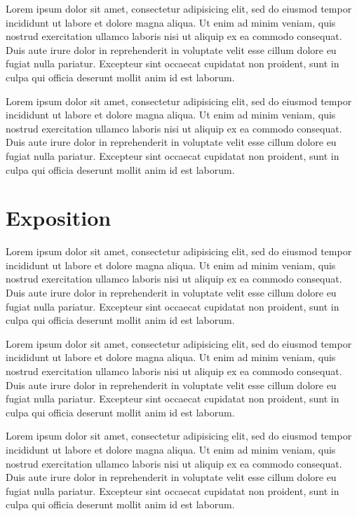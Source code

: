 \documentclass[conference]{acmsiggraph}
\begin{document}
Lorem ipsum dolor sit amet, consectetur adipisicing elit, sed do
eiusmod tempor incididunt ut labore et dolore magna aliqua. Ut enim ad
minim veniam, quis nostrud exercitation ullamco laboris nisi ut
aliquip ex ea commodo consequat. Duis aute irure dolor in
reprehenderit in voluptate velit esse cillum dolore eu fugiat nulla
pariatur. Excepteur sint occaecat cupidatat non proident, sunt in
culpa qui officia deserunt mollit anim id est laborum.

Lorem ipsum dolor sit amet, consectetur adipisicing elit, sed do
eiusmod tempor incididunt ut labore et dolore magna aliqua. Ut enim ad
minim veniam, quis nostrud exercitation ullamco laboris nisi ut
aliquip ex ea commodo consequat. Duis aute irure dolor in
reprehenderit in voluptate velit esse cillum dolore eu fugiat nulla
pariatur. Excepteur sint occaecat cupidatat non proident, sunt in
culpa qui officia deserunt mollit anim id est laborum.

\section{Exposition}

Lorem ipsum dolor sit amet, consectetur adipisicing elit, sed do
eiusmod tempor incididunt ut labore et dolore magna aliqua. Ut enim ad
minim veniam, quis nostrud exercitation ullamco laboris nisi ut
aliquip ex ea commodo consequat. Duis aute irure dolor in
reprehenderit in voluptate velit esse cillum dolore eu fugiat nulla
pariatur. Excepteur sint occaecat cupidatat non proident, sunt in
culpa qui officia deserunt mollit anim id est laborum.

Lorem ipsum dolor sit amet, consectetur adipisicing elit, sed do
eiusmod tempor incididunt ut labore et dolore magna aliqua. Ut enim ad
minim veniam, quis nostrud exercitation ullamco laboris nisi ut
aliquip ex ea commodo consequat. Duis aute irure dolor in
reprehenderit in voluptate velit esse cillum dolore eu fugiat nulla
pariatur. Excepteur sint occaecat cupidatat non proident, sunt in
culpa qui officia deserunt mollit anim id est laborum.

Lorem ipsum dolor sit amet, consectetur adipisicing elit, sed do
eiusmod tempor incididunt ut labore et dolore magna aliqua. Ut enim ad
minim veniam, quis nostrud exercitation ullamco laboris nisi ut
aliquip ex ea commodo consequat. Duis aute irure dolor in
reprehenderit in voluptate velit esse cillum dolore eu fugiat nulla
pariatur. Excepteur sint occaecat cupidatat non proident, sunt in
culpa qui officia deserunt mollit anim id est laborum.
\end{document}
